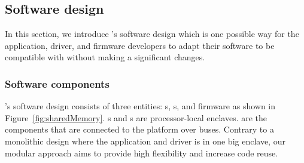 \subsection{Software design}
\label{sec:programmingModel}


In this section, we introduce \name{}'s software design which is one possible way for the application, driver, and firmware developers to adapt their software to be compatible with \name without making a significant changes.  


\subsubsection{Software components}
\label{sec:programmingModel:systemComponents}

\name's software design consists of three entities: \app{}s, \ce{}s, and \sphw firmware as shown in Figure~\ref{fig:sharedMemory}. \app{}s and \ce{}s are processor-local enclaves. \sphw are the components that are connected to the platform over buses. Contrary to a monolithic design where the application and driver is in one big enclave, our modular approach aims to provide high flexibility and increase code reuse.

\setcounter{para}{0}

